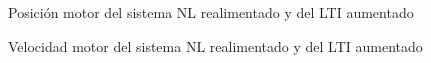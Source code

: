 \documentclass[a4paper, 10pt, onecolumn,journal]{ieeeconf}
\begin{document}
\begin{figure}[H]
	\centering
	\begin{adjustbox}{max width=\columnwidth}
	\end{adjustbox}
	\caption{Posición motor del sistema NL realimentado y del LTI aumentado}
	\label{Posición motor del sistema NL realimentado y del LTI aumentado}
\end{figure}
\begin{figure}[H]
	\centering
	\begin{adjustbox}{max width=\columnwidth}
	\end{adjustbox}
	\caption{Velocidad motor del sistema NL realimentado y del LTI aumentado}
	\label{Velocidad motor del sistema NL realimentado y del LTI aumentado}
\end{figure}
\end{document}

